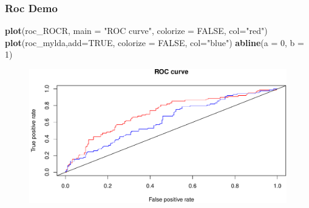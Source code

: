 \documentclass[
  shownotes,
  xcolor={svgnames},
  hyperref={colorlinks,citecolor=DarkBlue,linkcolor=DarkRed,urlcolor=DarkBlue}
  , aspectratio=169]{beamer}
\newenvironment{Shaded}{\begin{snugshade}}{\end{snugshade}}
\newcommand{\DataTypeTok}[1]{\textcolor[rgb]{0.13,0.29,0.53}{#1}}
\newcommand{\DecValTok}[1]{\textcolor[rgb]{0.00,0.00,0.81}{#1}}
\newcommand{\KeywordTok}[1]{\textcolor[rgb]{0.13,0.29,0.53}{\textbf{#1}}}
\newcommand{\NormalTok}[1]{#1}
\newcommand{\OtherTok}[1]{\textcolor[rgb]{0.56,0.35,0.01}{#1}}
\newcommand{\StringTok}[1]{\textcolor[rgb]{0.31,0.60,0.02}{#1}}
\begin{document}
\begin{frame}[fragile]
\frametitle{Roc Demo}

\begin{scriptsize}
\begin{Shaded}
\begin{Highlighting}[]
\KeywordTok{plot}\NormalTok{(roc\_ROCR, }\DataTypeTok{main =} \StringTok{"ROC curve"}\NormalTok{, }\DataTypeTok{colorize =} \OtherTok{FALSE}\NormalTok{, }\DataTypeTok{col=}\StringTok{"red"}\NormalTok{)}
\KeywordTok{plot}\NormalTok{(roc\_mylda,}\DataTypeTok{add=}\OtherTok{TRUE}\NormalTok{, }\DataTypeTok{colorize =} \OtherTok{FALSE}\NormalTok{, }\DataTypeTok{col=}\StringTok{"blue"}\NormalTok{)}
\KeywordTok{abline}\NormalTok{(}\DataTypeTok{a =} \DecValTok{0}\NormalTok{, }\DataTypeTok{b =} \DecValTok{1}\NormalTok{)}
\end{Highlighting}
\end{Shaded}
\end{scriptsize}

\begin{figure}[H] \centering
            \captionsetup{justification=centering}
              \includegraphics[scale=0.4]{figures/unnamed-chunk-11-1.pdf}
 \end{figure}

\end{frame}
\end{document}
